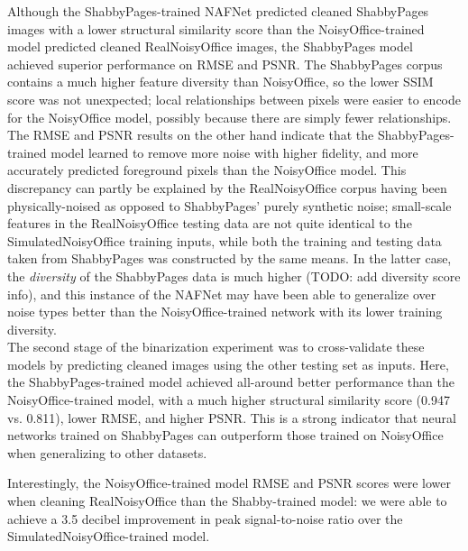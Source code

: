 \documentclass[runningheads]{llncs}
\begin{document}
Although the ShabbyPages-trained NAFNet predicted cleaned ShabbyPages images with a lower structural similarity score than the NoisyOffice-trained model predicted cleaned RealNoisyOffice images, the ShabbyPages model achieved superior performance on RMSE and PSNR. The ShabbyPages corpus contains a much higher feature diversity than NoisyOffice, so the lower SSIM score was not unexpected; local relationships between pixels were easier to encode for the NoisyOffice model, possibly because there are simply fewer relationships. The RMSE and PSNR results on the other hand indicate that the ShabbyPages-trained model learned to remove more noise with higher fidelity, and more accurately predicted foreground pixels than the NoisyOffice model. This discrepancy can partly be explained by the RealNoisyOffice corpus having been physically-noised as opposed to ShabbyPages' purely synthetic noise; small-scale features in the RealNoisyOffice testing data are not quite identical to the SimulatedNoisyOffice training inputs, while both the training and testing data taken from ShabbyPages was constructed by the same means. In the latter case, the \textit{diversity} of the ShabbyPages data is much higher (TODO: add diversity score info), and this instance of the NAFNet may have been able to generalize over noise types better than the NoisyOffice-trained network with its lower training diversity.\\

The second stage of the binarization experiment was to cross-validate these models by predicting cleaned images using the other testing set as inputs. Here, the ShabbyPages-trained model achieved all-around better performance than the NoisyOffice-trained model, with a much higher structural similarity score (0.947 vs. 0.811), lower RMSE, and higher PSNR. This is a strong indicator that neural networks trained on ShabbyPages can outperform those trained on NoisyOffice when generalizing to other datasets.

Interestingly, the NoisyOffice-trained model RMSE and PSNR scores were lower when cleaning RealNoisyOffice than the Shabby-trained model: we were able to achieve a 3.5 decibel improvement in peak signal-to-noise ratio over the SimulatedNoisyOffice-trained model.
\end{document}
